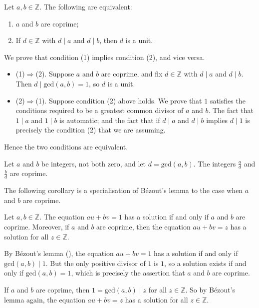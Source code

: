 \begin{proposition}
Let $a,b \in \mathbb{Z}$. The following are equivalent:
\begin{enumerate}[(1)] \setlength{\itemindent}{20pt}
\item $a$ and $b$ are coprime;
\item If $d \in \mathbb{Z}$ with $d \mid a$ and $d \mid b$, then $d$ is a unit.
\end{enumerate}
\end{proposition}
\begin{cproof} We prove that condition (1) implies condition (2), and vice versa.
\begin{itemize}
\item (1)$\Rightarrow$(2). Suppose $a$ and $b$ are coprime, and fix $d \in \mathbb{Z}$ with $d \mid a$ and $d \mid b$. Then $d \mid \mathrm{gcd}(a,b) = 1$, so $d$ is a unit.

\item (2)$\Rightarrow$(1). Suppose condition (2) above holds. We prove that $1$ satisfies the conditions required to be a greatest common divisor of $a$ and $b$. The fact that $1 \mid a$ and $1 \mid b$ is automatic; and the fact that if $d \mid a$ and $d \mid b$ implies $d \mid 1$ is precisely the condition (2) that we are assuming.
\end{itemize}

Hence the two conditions are equivalent.
\end{cproof}

\begin{exercise}
\label{exDivByGCDIsCoprime}
Let $a$ and $b$ be integers, not both zero, and let $d = \mathrm{gcd}(a,b)$. The integers $\frac{a}{d}$ and $\frac{b}{d}$ are coprime.
\end{exercise}

The following corollary is a specialisation of B\'{e}zout's lemma to the case when $a$ and $b$ are coprime.

\begin{corollary}
Let $a,b \in \mathbb{Z}$. The equation $au+bv=1$ has a solution if and only if $a$ and $b$ are coprime. Moreover, if $a$ and $b$ are coprime, then the equation $au+bv=z$ has a solution for all $z \in \mathbb{Z}$.
\end{corollary}

\begin{cproof}
By B\'{e}zout's lemma (), the equation $au+bv=1$ has a solution if and only if $\mathrm{gcd}(a,b) \mid 1$. But the only positive divisor of $1$ is $1$, so a solution exists if and only if $\mathrm{gcd}(a,b) = 1$, which is precisely the assertion that $a$ and $b$ are coprime.

If $a$ and $b$ are coprime, then $1 = \mathrm{gcd}(a,b) \mid z$ for all $z \in \mathbb{Z}$. So by B\'{e}zout's lemma again, the equation $au+bv=z$ has a solution for all $z \in \mathbb{Z}$.
\end{cproof}

